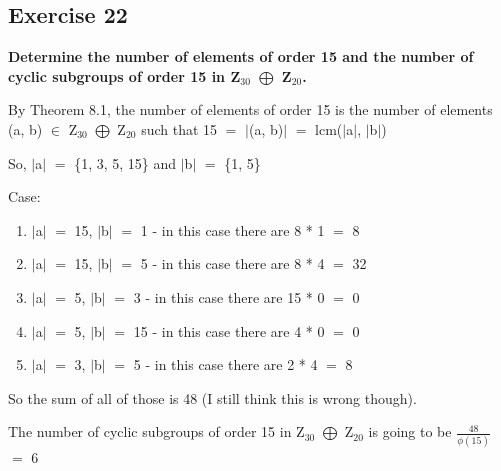 \documentclass{article}
\newcommand{\mt}[1]{\ensuremath{#1}}
\newcommand\ssc[2][\DefaultOpt]{%
  \def\DefaultOpt{#2}%
  \subsection[#1]{#2}%
}
\newcommand{\elist}{\end{enumerate}}
\newcommand{\bilist}{\begin{enumerate}[label=\roman*)]}
\newcommand{\mem}{\mt{\in} }
\newcommand{\av}[1]{\mt{|}#1\mt{|}}  %
\newcommand{\bk}[1]{\{#1\}}
\newcommand{\eql}{\mt{=} }
\newcommand{\uw}[2]{#1\mt{_{#2}}}
\newcommand{\frc}[2]{\mt{\frac{#1}{#2}}}
\newcommand{\edp}{\mt{\bigoplus} }
\begin{document}
{{}
\ssc{Exercise 22}{
\textbf{Determine the number of elements of order 15 and the number of cyclic subgroups of order 15 in \uw{Z}{30} \edp \uw{Z}{20}.}

By Theorem 8.1, the number of elements of order 15 is the number of elements (a, b) \mem \uw{Z}{30} \edp \uw{Z}{20} such that 15 \eql \av{(a, b)} \eql lcm(\av{a}, \av{b})

So, \av{a} \eql \bk{1, 3, 5, 15} and \av{b} \eql \bk{1, 5}

Case:
\bilist
\item \av{a} \eql 15, \av{b} \eql 1 - in this case there are 8 * 1 \eql 8
\item \av{a} \eql 15, \av{b} \eql 5 - in this case there are 8 * 4 \eql 32
\item \av{a} \eql 5, \av{b} \eql 3 - in this case there are 15 * 0 \eql 0
\item \av{a} \eql 5, \av{b} \eql 15 - in this case there are 4 * 0 \eql 0
\item \av{a} \eql 3, \av{b} \eql 5 - in this case there are 2 * 4 \eql 8
\elist

So the sum of all of those is 48 (I still think this is wrong though).

The number of cyclic subgroups of order 15 in \uw{Z}{30} \edp \uw{Z}{20} is going to be \frc{48}{\phi(15)} \eql 6
}
}
\end{document}
